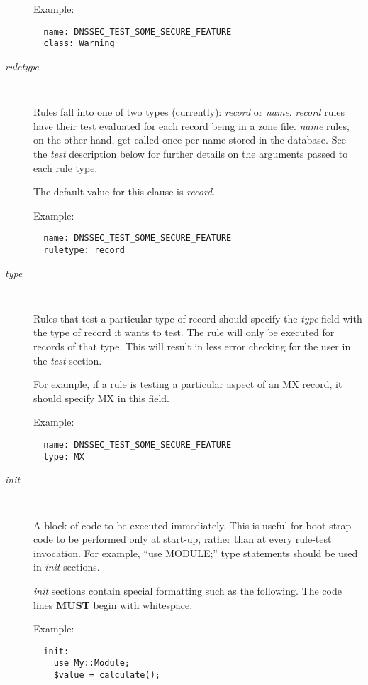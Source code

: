 \begin{description}
Example:
\begin{verbatim}
  name: DNSSEC_TEST_SOME_SECURE_FEATURE
  class: Warning
\end{verbatim}

\item [{\it ruletype}]\verb" "

Rules fall into one of two types (currently): {\it record} or {\it name}.
{\it record} rules have their test evaluated for each record being in
a zone file.  {\it name} rules, on the other hand, get called once per
name stored in the database.  See the {\it test} description below for
further details on the arguments passed to each rule type.

The default value for this clause is {\it record}.

Example:

\begin{verbatim}
  name: DNSSEC_TEST_SOME_SECURE_FEATURE
  ruletype: record
\end{verbatim}

\item [{\it type}]\verb" "

Rules that test a particular type of record should specify the
{\it type} field with the type of record it wants to test.  The rule
will only be executed for records of that type.  This will result
in less error checking for the user in the {\it test} section.

For example, if a rule is testing a particular aspect of an MX record,
it should specify MX in this field.

Example:

\begin{verbatim}
  name: DNSSEC_TEST_SOME_SECURE_FEATURE
  type: MX
\end{verbatim}

\item [{\it init}]\verb" "

A block of code to be executed immediately. This is useful for
boot-strap code to be performed only at start-up, rather than
at every rule-test invocation.  For example, ``use MODULE;''
type statements should be used in {\it init} sections.

{\it init} sections contain special formatting such as the following.
The code lines {\bf MUST} begin with whitespace.

Example:

\begin{verbatim}
  init:
    use My::Module;
    $value = calculate();
\end{verbatim}


\end{description}
